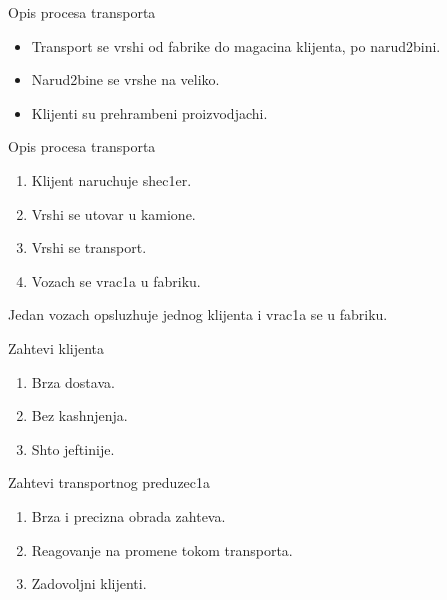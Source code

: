 \documentclass[11pt]{beamer}
\begin{document}
\begin{frame}{Opis procesa transporta}
    \begin{itemize}
    
    \item  Transport se vrshi od fabrike do magacina klijenta, po narud2bini.
    \item Narud2bine se vrshe na veliko.
    \item Klijenti su prehrambeni proizvodjachi.
    
    \end{itemize}
    
\end{frame}
\begin{frame}{Opis procesa transporta}
    
    \begin{enumerate}
        \item Klijent naruchuje shec1er.
        \item Vrshi se utovar u kamione.
        \item Vrshi se transport.
        \item Vozach se vrac1a u fabriku.
    \end{enumerate}

    Jedan vozach opsluzhuje jednog klijenta i vrac1a se u fabriku.
\end{frame}
\begin{frame}{Zahtevi klijenta}
    
    \begin{enumerate}
        \item Brza dostava.
        \item Bez kashnjenja.
        \item Shto jeftinije.
    \end{enumerate}
\end{frame}
\begin{frame}{Zahtevi transportnog preduzec1a}
    
    \begin{enumerate}
        \item Brza i precizna obrada zahteva.
        \item Reagovanje na promene tokom transporta.
        \item Zadovoljni klijenti.
    \end{enumerate}
\end{frame}
\end{document}
